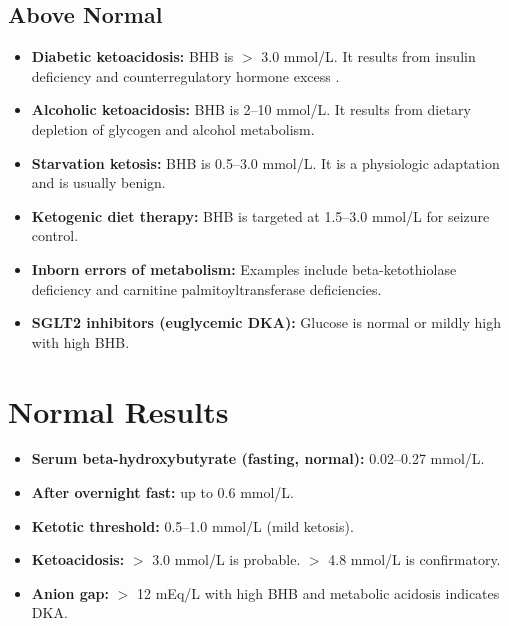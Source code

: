 \subsection*{Above Normal}
\begin{itemize}
  \item \textbf{Diabetic ketoacidosis:} BHB is $>$ 3.0 mmol/L. It results from insulin deficiency and counterregulatory hormone excess \cite{kitabchi2009hyperglycemic}.
  \item \textbf{Alcoholic ketoacidosis:} BHB is 2--10 mmol/L. It results from dietary depletion of glycogen and alcohol metabolism.
  \item \textbf{Starvation ketosis:} BHB is 0.5--3.0 mmol/L. It is a physiologic adaptation and is usually benign.
  \item \textbf{Ketogenic diet therapy:} BHB is targeted at 1.5--3.0 mmol/L for seizure control.
  \item \textbf{Inborn errors of metabolism:} Examples include beta-ketothiolase deficiency and carnitine palmitoyltransferase deficiencies.
  \item \textbf{SGLT2 inhibitors (euglycemic DKA):} Glucose is normal or mildly high with high BHB.
\end{itemize}

\section*{Normal Results}
\begin{itemize}
  \item \textbf{Serum beta-hydroxybutyrate (fasting, normal):} 0.02--0.27 mmol/L.
  \item \textbf{After overnight fast:} up to 0.6 mmol/L.
  \item \textbf{Ketotic threshold:} 0.5--1.0 mmol/L (mild ketosis).
  \item \textbf{Ketoacidosis:} $>$ 3.0 mmol/L is probable. $>$ 4.8 mmol/L is confirmatory.
  \item \textbf{Anion gap:} $>$ 12 mEq/L with high BHB and metabolic acidosis indicates DKA.
\end{itemize}

